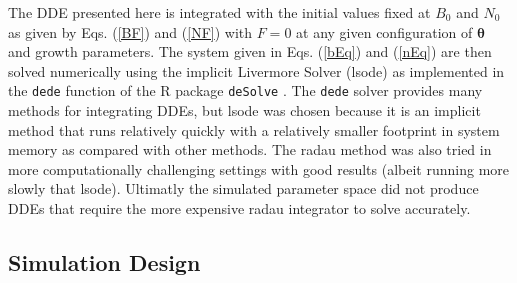 %
The DDE presented here is integrated with the initial values fixed at $B_0$ 
and $N_0$ as given by Eqs. (\ref{BF}) and (\ref{NF}) with $F=0$ at any given 
configuration of $\bm{\theta}$ and growth parameters. %
The system given in Eqs. (\ref{bEq}) and (\ref{nEq}) are then solved 
numerically using the implicit Livermore Solver (lsode) as implemented in the 
\verb|dede| function of the R package \verb|deSolve| . 
The \verb|dede| solver provides many methods for integrating DDEs, but lsode 
was chosen because it is an implicit method that runs relatively quickly with 
a relatively smaller footprint in system memory as compared with other methods. 
The radau method was also tried in more computationally challenging settings 
with good results (albeit running more slowly that lsode). Ultimatly the 
simulated parameter space did not produce DDEs that require the more expensive 
radau integrator to solve accurately.
 
%



%
\subsection{Simulation Design}


